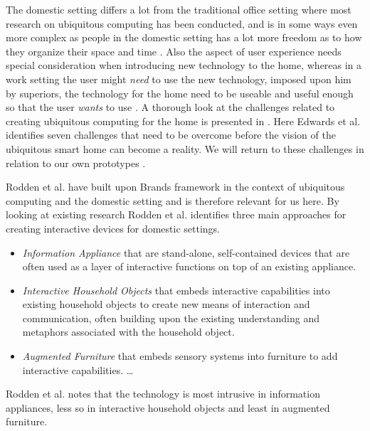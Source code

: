 The domestic setting differs a lot from the traditional office setting where most research on ubiquitous computing has been conducted, and is in some ways even more complex as people in the domestic setting has a lot more freedom as to how they organize their space and time \cite{meyer2003survey}.
Also the aspect of user experience needs special consideration when introducing new technology to the home, whereas in a work setting the user might \emph{need} to use the new technology, imposed upon him by superiors, the technology for the home need to be useable and useful enough so that the user \emph{wants} to use \cite{meyer2003survey}.
A thorough look at the challenges related to creating ubiquitous computing for the home is presented in \cite{edwards2001home}.
Here Edwards et al. identifies seven challenges that need to be overcome before the vision of the ubiquitous smart home can become a reality. We will return to these challenges in relation to our own prototypes .

Rodden et al. \cite{rodden2003evolution} have built upon Brands framework in the context of ubiquitous computing and the domestic setting and is therefore relevant for us here.
By looking at existing research Rodden et al. identifies three main approaches for creating interactive devices for domestic settings.

\begin{itemize}
  \item \emph{Information Appliance} that are stand-alone, self-contained devices that are often used as a layer of interactive functions on top of an existing appliance.
  \item \emph{Interactive Household Objects} that embeds interactive capabilities into existing household objects to create new means of interaction and communication, often building upon the existing understanding and metaphors associated with the household object.
  \item \emph{Augmented Furniture} that embeds sensory systems into furniture to add interactive capabilities. \ldots
\end{itemize}

Rodden et al. notes that the technology is most intrusive in information appliances, less so in interactive household objects and least in augmented furniture.

